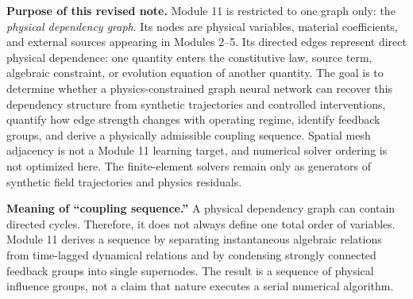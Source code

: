 \documentclass[11pt]{article}
\begin{document}

\begin{overviewbox}
\textbf{Purpose of this revised note.} Module 11 is restricted to one graph only: the \emph{physical dependency graph}. Its nodes are physical variables, material coefficients, and external sources appearing in Modules 2--5. Its directed edges represent direct physical dependence: one quantity enters the constitutive law, source term, algebraic constraint, or evolution equation of another quantity. The goal is to determine whether a physics-constrained graph neural network can recover this dependency structure from synthetic trajectories and controlled interventions, quantify how edge strength changes with operating regime, identify feedback groups, and derive a physically admissible coupling sequence. Spatial mesh adjacency is not a Module 11 learning target, and numerical solver ordering is not optimized here. The finite-element solvers remain only as generators of synthetic field trajectories and physics residuals.
\end{overviewbox}

\begin{warningbox}
\textbf{Meaning of ``coupling sequence.''} A physical dependency graph can contain directed cycles. Therefore, it does not always define one total order of variables. Module 11 derives a sequence by separating instantaneous algebraic relations from time-lagged dynamical relations and by condensing strongly connected feedback groups into single supernodes. The result is a sequence of physical influence groups, not a claim that nature executes a serial numerical algorithm.
\end{warningbox}

\ProjectTOC
\end{document}
